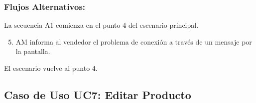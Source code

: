 \begin{framed}
\subsubsection{Flujos Alternativos: }

La secuencia A1 comienza en el punto 4 del escenario principal.
\begin{enumerate}
    \setcounter{enumi}{4}
    \item AM informa al vendedor el problema de conexión a través de un mensaje por la pantalla.
\end{enumerate}
El escenario vuelve al punto 4.

\end{framed}


\subsection{Caso de Uso UC7: Editar Producto}

